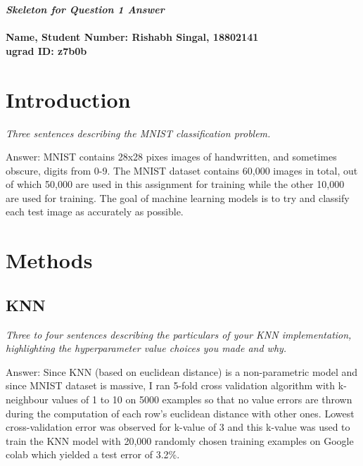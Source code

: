 \documentclass{article}
\def\ans#1{\par\gre{Answer: #1}}{}
\def\gre#1{{\color{gre}#1}}
\begin{document}
{\small


}
\newpage



%
%
{\em \bf Skeleton for Question 1 Answer}
\\ \\
\textbf{Name, Student Number: Rishabh Singal, 18802141}\\
\textbf{ugrad ID: z7b0b}

\section{Introduction}

\emph{Three sentences describing the MNIST classification problem.}
\ans{MNIST contains 28x28 pixes images of handwritten, and sometimes obscure, digits from 0-9.  The MNIST dataset contains 60,000 images in total, out of which 50,000 are used in this assignment for training while the other 10,000 are used for training. The goal of machine learning models is to try and classify each test image as accurately as possible.}
\section{Methods}
\subsection{KNN}
\emph{Three to four sentences describing the particulars of your KNN implementation, highlighting the hyperparameter value choices you made and why.}
\ans{Since KNN (based on euclidean distance) is a non-parametric model and since MNIST dataset is massive, I ran 5-fold cross validation algorithm with k-neighbour values of 1 to 10 on 5000 examples so that no value errors are thrown during the computation of each row's euclidean distance with other ones. Lowest cross-validation error was observed for k-value of 3 and this k-value was used to train the KNN model with 20,000 randomly chosen training examples on Google colab which yielded a test error of 3.2\%.}
\end{document}
